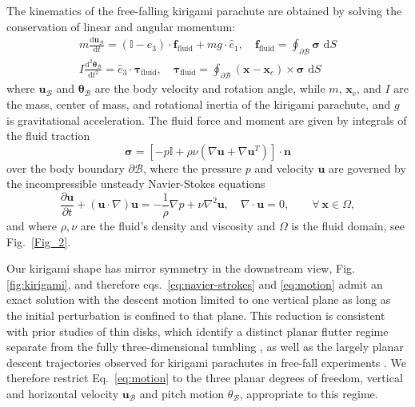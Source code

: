 \documentclass[lineno]{JFM-FLM_Au}
\begin{document}
The kinematics of the free-falling kirigami parachute are obtained by solving the conservation of linear and angular momentum:
\begin{equation}\label{eq:motion}
    \begin{split}
        m\frac{\text{d}\bm{u}_\mathcal{B}}{\text{d}t} = (\mathbb{I}-\hat{e}_3)\cdot\bm{f}_\text{fluid} + mg\cdot\hat{e}_1,\quad
        \bm{f}_\text{fluid}=\oint_{\partial\mathcal{B}}\bm \sigma\text{ d}S \\
        I\frac{\text{d}^2\bm{\theta}_\mathcal{B}}{\text{d}t^2} = \hat{e}_3\cdot\bm{\tau}_\text{fluid},\quad
        \bm{\tau}_\text{fluid}=\oint_{\partial\mathcal{B}}(\bm{x}-\bm{x}_c)\times\bm\sigma\text{ d}S
    \end{split}
\end{equation}
where $\bm{u}_\mathcal{B}$ and $\bm{\theta}_\mathcal{B}$ are the body velocity and rotation angle, while $m$, $\bm x_c$, and $I$ are the mass, center of mass, and rotational inertia of the kirigami parachute, and $g$ is gravitational acceleration.
The fluid force and moment are given by integrals of the fluid traction
\begin{equation}
    \bm\sigma = \left[-p\mathbb{I} + \rho \nu\left(\nabla\bm u + \nabla\bm u^T\right)\right]\cdot\bm{n}
\end{equation}
over the body boundary $\partial \mathcal{B}$, where the pressure $p$ and velocity $\bm u$ are governed by the incompressible unsteady Navier-Stokes equations
\begin{equation}\label{eq:navier-strokes}
     \frac{\partial\bm{u}}{\partial t} +\left(\bm{u}\cdot\nabla\right)\bm{u} = -\frac 1 \rho \nabla p + \nu\nabla^2\bm{u}, \quad
    \nabla\cdot\bm{u}=0, \quad\quad\forall\ \bm{x}\in\Omega,
\end{equation}
and where $\rho,\nu$ are the fluid's density and viscosity and $\Omega$ is the fluid domain, see Fig.~\ref{Fig_2}. 

Our kirigami shape has mirror symmetry in the downstream view, Fig.\ref{fig:kirigami}, and therefore eqs.~\ref{eq:navier-strokes} and \ref{eq:motion} admit an exact solution with the descent motion limited to one vertical plane as long as the initial perturbation is confined to that plane. This reduction is consistent with prior studies of thin disks, which identify a distinct planar flutter regime separate from the fully three-dimensional tumbling \citep{Auguste2013FallingDisks}, as well as the largely planar descent trajectories observed for kirigami parachutes in free-fall experiments \citep{Lamoureux2025Kirigami-inspiredReconfiguration}. We therefore restrict Eq.~\ref{eq:motion} to the three planar degrees of freedom, vertical and horizontal velocity $\bm u_\mathcal{B}$ and pitch motion $\theta_\mathcal{B}$, appropriate to this regime.
\end{document}
